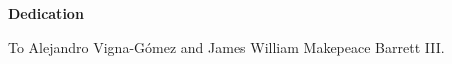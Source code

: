\begin{flushleft}
	{\LARGE\textbf{Dedication}\\}
\end{flushleft}

To Alejandro Vigna-G\'omez and James William Makepeace Barrett III.